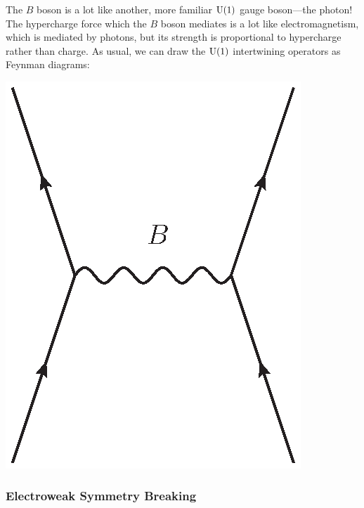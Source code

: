 \documentclass[12pt]{article}
\newcommand{\U}{{\rm U}}    %
\begin{document}
The $B$ boson is a lot like another, more familiar $\U(1)$ gauge boson---the
photon! The hypercharge force which the $B$ boson mediates is a lot like
electromagnetism, which is mediated by photons, but its strength is
proportional to hypercharge rather than charge.  As usual, we can
draw the $\U(1)$ intertwining operators as Feynman diagrams:
\begin{center}
	\includegraphics[scale=0.5]{B_exchange}
\end{center}

\subsubsection{Electroweak Symmetry Breaking} \label{sec:electroweak}
\end{document}
